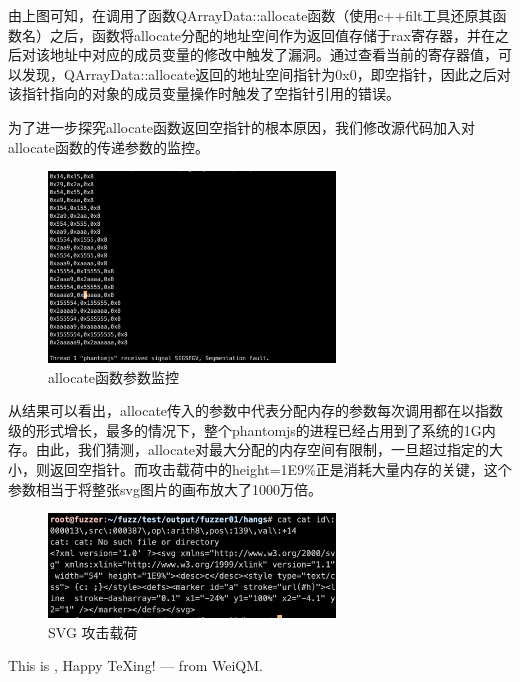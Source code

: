 \documentclass[doctor,privacy,twoside]{buaa_mac}
\begin{document}
 由上图可知，在调用了函数QArrayData::allocate函数（使用c++filt工具还原其函数名）之后，函数将allocate分配的地址空间作为返回值存储于rax寄存器，并在之后对该地址中对应的成员变量的修改中触发了漏洞。通过查看当前的寄存器值，可以发现，QArrayData::allocate返回的地址空间指针为0x0，即空指针，因此之后对该指针指向的对象的成员变量操作时触发了空指针引用的错误。
 
 为了进一步探究allocate函数返回空指针的根本原因，我们修改源代码加入对allocate函数的传递参数的监控。
 
  \centerline{}
\begin{figure}[!h]
  \centering
  \includegraphics[width=0.68\textwidth]{images/gdb_parameter.png}
  \caption{allocate函数参数监控}
  \label{fig:logo}
\end{figure}
\centerline{}

  
从结果可以看出，allocate传入的参数中代表分配内存的参数每次调用都在以指数级的形式增长，最多的情况下，整个phantomjs的进程已经占用到了系统的1G内存。由此，我们猜测，allocate对最大分配的内存空间有限制，一旦超过指定的大小，则返回空指针。而攻击载荷中的height=1E9\%正是消耗大量内存的关键，这个参数相当于将整张svg图片的画布放大了1000万倍。

  \centerline{}
\begin{figure}[!h]
  \centering
  \includegraphics[width=0.68\textwidth]{images/svg_payload.png}
  \caption{SVG 攻击载荷}
  \label{fig:logo}
\end{figure}
\centerline{}










\vspace{5cm}

This is \BUAAThesis{}, Happy TeXing! --- from WeiQM.
\end{document}
